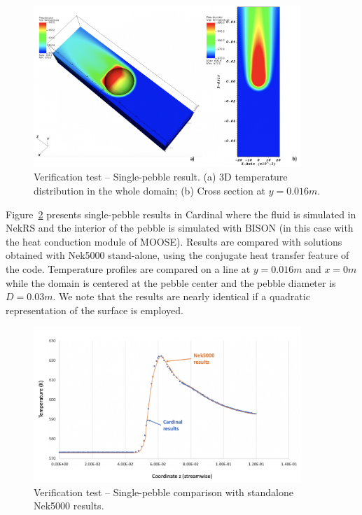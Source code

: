 \begin{figure}[!h]
\centering
\includegraphics[clip=true,width=0.9\textwidth]{Figures/nrs_vv1}
\caption{Verification test -- Single-pebble result. (a) 3D temperature distribution in the whole domain; (b) Cross section at $y=0.016 m$.}
\label{f:nrs1}
\end{figure}

Figure~\ref{f:nrs2} presents single-pebble results in Cardinal  where the fluid is simulated in NekRS and the interior of the pebble is simulated with BISON (in this case with the heat conduction module of MOOSE). Results are compared with solutions obtained with Nek5000 stand-alone, using the conjugate heat transfer feature of the code. Temperature profiles are compared on a line at $y=0.016 m$ and $x=0 m$ while the domain is centered at the pebble center and the pebble diameter is $D=0.03 m$. We note that the results are nearly identical if a quadratic representation of the surface is employed.

\begin{figure}[!h]
\centering
\includegraphics[clip=true,width=0.9\textwidth]{Figures/nrs_vv2}
\caption{Verification test -- Single-pebble comparison with standalone Nek5000 results. }
\label{f:nrs2}
\end{figure}

